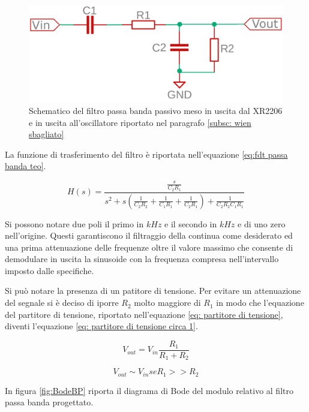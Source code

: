 \documentclass[titlepage]{report}
\begin{document}
\begin{figure}[H]
	\centering
	\includegraphics[scale=0.25]{Immagini/sch_crc_no_valori.png}
	\caption{Schematico del filtro passa banda passivo meso in uscita dal XR2206 e in uscita all'oscillatore riportato nel paragrafo \ref{subsc: wien sbagliato}}
	\label{fig:FiltroBP}
\end{figure}

La funzione di trasferimento del filtro è riportata nell'equazione \ref{eq:fdt passa banda teo}.

\begin{equation}
	\label{eq:fdt passa banda teo}
	H(s) = \frac{\frac{s}{C_2R_1}}{s^2 + s(\frac{1}{C_2R_2} + \frac{1}{C_1R_1} + \frac{1}{C_2R_1}) + \frac{1}{C_2R_2C_1R_1}}
\end{equation}

Si possono notare due poli il primo in \textit{$kHz$} e il secondo in \textit{$kHz$} e di uno zero nell'origine. Questi garantiscono il filtraggio della continua come desiderato ed una prima attenuazione delle frequenze oltre il valore massimo che consente di demodulare in uscita la sinusoide con la frequenza compresa nell'intervallo imposto dalle specifiche.

Si può notare la presenza di un patitore di tensione. Per evitare un attenuazione del segnale si è deciso di iporre $R_2$ molto maggiore di $R_1$ in modo che l'equazione del partitore di tensione, riportato nell'equazione \ref{eq: partitore di tensione}, diventi l'equazione \ref{eq: partitore di tensione circa 1}.

\begin{equation}
	V_{out} = V_{in} \frac{R_1}{R_1 + R_2}
	\label{eq: partitore di tensione}
\end{equation}

\begin{equation}
	V_{out} \sim  V_{in}   se   R_1 >> R_2
	\label{eq: partitore di tensione circa 1}
\end{equation}

In figura \ref{fig:BodeBP} riporta il diagrama di Bode del modulo relativo al filtro passa banda progettato.
\end{document}
